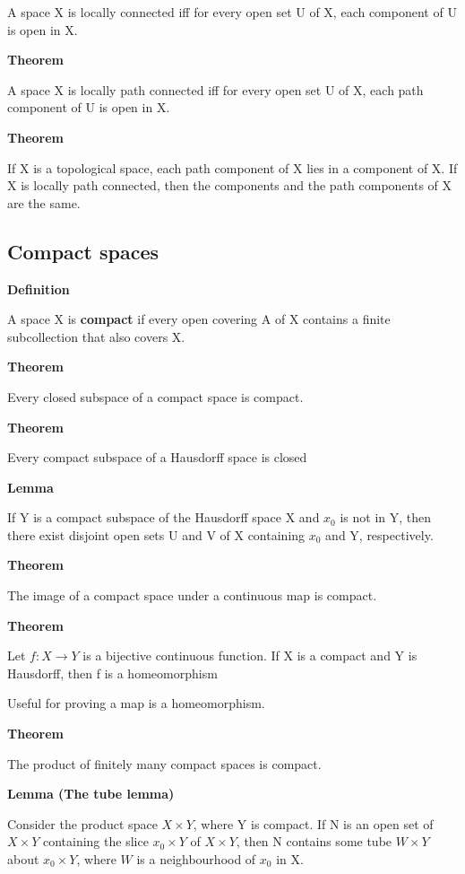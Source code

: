 \documentclass[11pt]{article}
\begin{document}
A space X is locally connected iff for every open set U of X, each component of U is open in X.

\textbf{Theorem}

A space X is locally path connected iff for every open set U of X, each path component of U is open in X.

\textbf{Theorem}

If X is a topological space, each path component of X lies in a component of X. If X is locally path connected, then the components and the path components of X are the same.


\subsection{Compact spaces}
\label{sec:org62b9296}

\textbf{Definition}

A space X is \textbf{compact} if every open covering A of X contains a finite subcollection that also covers X.

\textbf{Theorem}

Every closed subspace of a compact space is compact.

\textbf{Theorem}

Every compact subspace of a Hausdorff space is closed

\textbf{Lemma}

If Y is a compact subspace of the Hausdorff space X and \(x_0\) is not in Y, then there exist disjoint open sets U and V of X containing \(x_0\) and Y, respectively.

\textbf{Theorem}

The image of a compact space under a continuous map is compact.


\textbf{Theorem}

Let \(f : X \to Y\) is a bijective continuous function. If X is a compact and Y is Hausdorff, then f is a homeomorphism

Useful for proving a map is a homeomorphism.

\textbf{Theorem}

The product of finitely many compact spaces is compact.

\textbf{Lemma (The tube lemma)}

Consider the product space \(X \times Y\), where Y is compact. If N is an open set of \(X \times Y\) containing the slice \(x_0 \times Y\) of \(X \times Y\), then N contains some tube \(W \times Y\) about \(x_0 \times Y\), where \(W\) is a neighbourhood of \(x_0\) in X.
\end{document}
